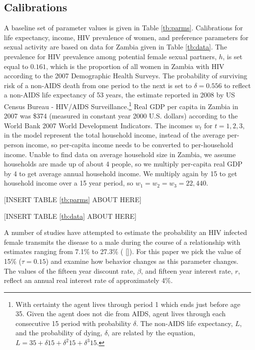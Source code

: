 \documentclass[12pt]{article}
\begin{document}
\subsection{Calibrations}
A baseline set of parameter values is given in Table \ref{tb:parms}.  Calibrations for life expectancy, income, HIV prevalence of women, and preference parameters for sexual activity are based on data for Zambia given in Table \ref{tb:data}.  The prevalence for HIV prevalence among potential female sexual partners, $h$, is set equal to $0.161$, which is the proportion of all women in Zambia with HIV according to the 2007 Demographic Health Surveys.  The probability of surviving risk of a non-AIDS death from one period to the next is set to $\delta=0.556$ to reflect a non-AIDS life expectancy of 53 years, the estimate reported in 2008 by US Census Bureau - HIV/AIDS Surveillance.\footnote{With certainty the agent lives through period 1 which ends just before age 35.  Given the agent does not die from AIDS, agent lives through each consecutive 15 period with probability $\delta$.  The non-AIDS life expectancy, $L$, and the probability of dying, $\delta$, are related by the equation, $L=35 + \delta 15 + \delta^2 15 + \delta^3 15$.}  Real GDP per capita in Zambia in 2007 was \$374 (measured in constant year 2000 U.S. dollars) according to the World Bank 2007 World Development Indicators.  The incomes $w_t$ for $t=1,2,3$, in the model represent the total household income, instead of the average per-person income, so per-capita income needs to be converted to per-household income.  Unable to find data on average household size in Zambia, we assume households are made up of about 4 people, so we multiply per-capita real GDP by 4 to get average annual household income.  We multiply again by 15 to get household income over a 15 year period, so $w_1=w_2=w_3=22,440$.

\begin{center}[INSERT TABLE \ref{tb:parms} ABOUT HERE]\end{center}

\begin{center}[INSERT TABLE \ref{tb:data} ABOUT HERE]\end{center}

A number of studies have attempted to estimate the probability an HIV infected female transmits the disease to a male during the course of a relationship with estimates ranging from 7.1\% to 27.3\% (\citeauthor*{eo2009} [\citeyear{eo2009}]).  For this paper we pick the value of 15\% ($\tau=0.15$) and examine how behavior changes as this parameter changes.  The values of the fifteen year discount rate, $\beta$, and fifteen year interest rate, $r$, reflect an annual real interest rate of approximately 4\%.
\end{document}
